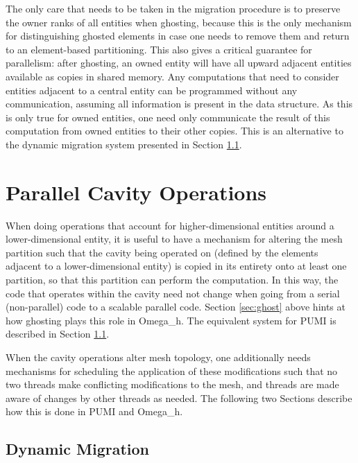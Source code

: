 The only care that needs to be taken in the migration procedure
is to preserve the owner ranks of all entities when ghosting,
because this is the only mechanism for distinguishing ghosted
elements in case one needs to remove them and return to
an element-based partitioning.
This also gives a critical guarantee for parallelism:
after ghosting, an owned entity will have all upward adjacent
entities available as copies in shared memory.
Any computations that need to consider entities adjacent to
a central entity can be programmed without any communication,
assuming all information is present in the data structure.
As this is only true for owned entities, one need only communicate
the result of this computation from owned entities to their other
copies.
This is an alternative to the dynamic migration system
presented in Section \ref{sec:cavity_operator}.

\section{Parallel Cavity Operations}
\label{sec:cavity_sched}

When doing operations that account for higher-dimensional entities
around a lower-dimensional entity, it is useful to have a mechanism
for altering the mesh partition such that the cavity being operated
on (defined by the elements adjacent to a lower-dimensional entity)
is copied in its entirety onto at least one partition, so that this
partition can perform the computation.
In this way, the code that operates within the cavity need not change
when going from a serial (non-parallel) code to a scalable parallel code.
Section \ref{sec:ghost} above hints at how ghosting plays this role
in Omega\_h.
The equivalent system for PUMI is described in Section \ref{sec:cavity_operator}.

When the cavity operations alter mesh topology, one additionally needs
mechanisms for scheduling the application of these modifications
such that no two threads make conflicting modifications to the mesh,
and threads are made aware of changes by other threads as needed.
The following two Sections describe how this is done in PUMI and Omega\_h.

\subsection{Dynamic Migration}
\label{sec:cavity_operator}

